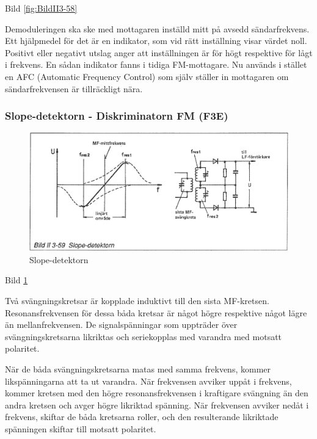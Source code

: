 Bild \ref{fig:BildII3-58}

Demoduleringen ska ske med mottagaren inställd mitt på avsedd
sändarfrekvens. Ett hjälpmedel för det är en indikator, som vid rätt
inställning visar värdet noll. Positivt eller negativt utslag anger
att inställningen är för högt respektive för lågt i frekvens. En sådan
indikator fanns i tidiga FM-mottagare. Nu används i stället en AFC
(Automatic Frequency Control) som själv ställer in mottagaren
om sändarfrekvensen är tillräckligt nära.

\subsubsection{Slope-detektorn - Diskriminatorn FM (F3E)}

\begin{figure}
\includegraphics[width=\textwidth]{images/bild_2_3-59}
\caption{Slope-detektorn}
\label{fig:BildII3-59}
\end{figure}

Bild \ref{fig:BildII3-59}

Två svängningskretsar är kopplade induktivt till den sista
MF-kretsen. Resonansfrekvensen för dessa båda kretsar är något högre
respektive något lägre än mellanfrekvensen. De signalspänningar som
uppträder över svängningskretsarna likriktas och seriekopplas med
varandra med motsatt polaritet.

När de båda svängningskretsarna matas med samma frekvens, kommer
likspänningarna att ta ut varandra. När frekvensen avviker uppåt i
frekvens, kommer kretsen med den högre resonansfrekvensen i kraftigare
svängning än den andra kretsen och avger högre likriktad spänning. När
frekvensen avviker nedåt i frekvens, skiftar de båda kretsarna roller,
och den resulterande likriktade spänningen skiftar till motsatt
polaritet.

